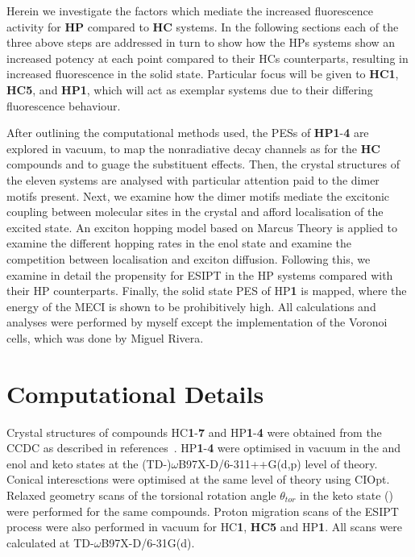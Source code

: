 Herein we investigate the factors which mediate the increased fluorescence activity for \textbf{HP} compared to \textbf{HC} systems. In the following sections each of the three above steps are addressed in turn to show how the \acp{HP} systems show an increased potency at each point compared to their \acp{HC} counterparts, resulting in increased fluorescence in the solid state. Particular focus will be given to \textbf{HC1}, \textbf{HC5}, and \textbf{HP1}, which will act as exemplar systems due to their differing fluorescence behaviour.

After outlining the computational methods used, the \acp{PES} of \textbf{HP1}-\textbf{4} are explored in vacuum, to map the nonradiative decay channels as for the \textbf{HC} compounds and to guage the substituent effects. Then, the crystal structures of the eleven systems are analysed with particular attention paid to the dimer motifs present. Next, we examine how the dimer motifs mediate the excitonic coupling between molecular sites in the crystal and afford localisation of the excited state. An exciton hopping model based on Marcus Theory is applied to examine the different hopping rates in the enol state and examine the competition between localisation and exciton diffusion. Following this, we examine in detail the propensity for ESIPT in the \ac{HP} systems compared with their \ac{HP} counterparts. Finally, the solid state \ac{PES}  of \ac{HP}\textbf{1} is mapped, where the energy of the \ac{MECI} is shown to be prohibitively high. All calculations and analyses were performed by myself except the implementation of the Voronoi cells, which was done by Miguel Rivera.

\section{Computational Details}\label{section: Connecting_Comp}
Crystal structures of compounds \ac{HC}\textbf{1}-\textbf{7} and \ac{HP}\textbf{1}-\textbf{4} were obtained from the CCDC as described in references{~}. \ac{HP}\textbf{1}-\textbf{4} were optimised in vacuum in the \szero{} and \sone{} enol and keto states at the (TD-)$\omega$B97X-D/6-311++G(d,p) level of theory. Conical interesctions were optimised at the same level of theory using CIOpt. Relaxed geometry scans of the torsional rotation angle $\theta_{tor}$ in the keto \sone{} state (\Kstar) were performed for the same compounds. Proton migration scans of the ESIPT process were also performed in vacuum for \ac{HC}\textbf{1}, \textbf{HC5} and \ac{HP}\textbf{1}. All scans were calculated at TD-$\omega$B97X-D/6-31G(d). 

